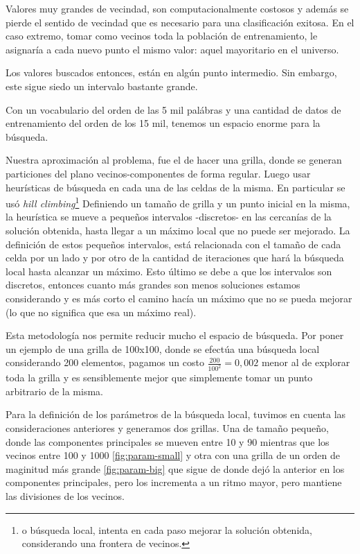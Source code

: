 Valores muy grandes de vecindad, son computacionalmente costosos y
además se pierde el sentido de vecindad que es necesario para una
clasificación exitosa. En el caso extremo, tomar como vecinos toda la
población de entrenamiento, le asignaría a cada nuevo punto el mismo
valor: aquel mayoritario en el universo.

Los valores buscados entonces, están en algún punto intermedio. Sin
embargo, este sigue siedo un intervalo bastante grande.

Con un vocabulario del orden de las 5 mil palábras y una cantidad de
datos de entrenamiento del orden de los 15 mil, tenemos un espacio
enorme para la búsqueda.

Nuestra aproximación al problema, fue el de hacer una grilla, donde se
generan particiones del plano vecinos-componentes de forma
regular. Luego usar heurísticas de búsqueda en cada una de las celdas
de la misma. En particular se usó \emph{hill
  climbing}\cite{aima}\footnote{o búsqueda local, intenta en cada paso
  mejorar la solución obtenida, considerando una frontera de vecinos.}
Definiendo un tamaño de grilla y un punto inicial en la misma, la
heurística se mueve a pequeños intervalos -discretos- en las cercanías
de la solución obtenida, hasta llegar a un máximo local que no puede
ser mejorado. La definición de estos pequeños intervalos, está
relacionada con el tamaño de cada celda por un lado y por otro de la
cantidad de iteraciones que hará la búsqueda local hasta alcanzar un
máximo. Esto último se debe a que los intervalos son discretos,
entonces cuanto más grandes son menos soluciones estamos considerando
y es más corto el camino hacía un máximo que no se pueda mejorar (lo
que no significa que esa un máximo real).

Esta metodología nos permite reducir mucho el espacio de búsqueda. Por
poner un ejemplo de una grilla de 100x100, donde se efectúa una
búsqueda local considerando 200 elementos, pagamos un costo
$\frac{200}{100^2} = 0,002$ menor al de explorar toda la grilla y es
sensiblemente mejor que simplemente tomar un punto arbitrario de la
misma.

Para la definición de los parámetros de la búsqueda local, tuvimos en
cuenta las consideraciones anteriores y generamos dos grillas. Una de
tamaño pequeño, donde las componentes principales se mueven entre 10 y
90 mientras que los vecinos entre 100 y 1000 \ref{fig:param-small} y
otra con una grilla de un orden de maginitud más grande
\ref{fig:param-big} que sigue de donde dejó la anterior en los
componentes principales, pero los incrementa a un ritmo mayor, pero
mantiene las divisiones de los vecinos.


